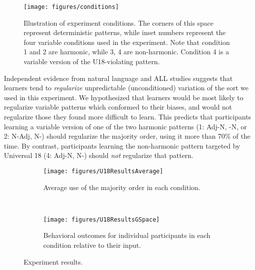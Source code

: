\documentclass[output=paper]{langsci/langscibook}
\begin{document}
\begin{figure}
\texttt{[image: figures/conditions]}
\caption{Illustration of experiment conditions. The corners of this space represent deterministic patterns, while inset numbers represent the four variable conditions used in the experiment. Note that condition 1 and 2 are harmonic, while 3, 4 are non-harmonic. Condition 4 is a variable version of the U18-violating pattern.}\label{fig: U18conditions}
\end{figure}

Independent evidence from natural language and  ALL studies \citep[e.g.,][]{SingletonNewport04,HudsonKamNewport09} suggests that learners tend to \textit{regularize}  unpredictable (unconditioned) variation of the sort we used in this experiment. We hypothesized that learners would be most likely to regularize variable patterns which conformed to their biases,  and would not regularize those they found more difficult to learn. This predicts that participants learning a variable version of one of the two harmonic  patterns (1: Adj-N, -N, or 2: N-Adj, N-) should regularize the majority order, using it more than 70\% of the time. By contrast, participants learning the non-harmonic pattern targeted by Universal 18 (4: Adj-N, N-) should \textit{not} regularize that pattern.

 


\begin{figure}
\begin{subfigure}[b]{0.45\textwidth}
\texttt{[image: figures/U18ResultsAverage]}%
\caption{Average use of the majority order in each condition.\\}
\end{subfigure}
~~~~
\begin{subfigure}[b]{0.45\textwidth}
\texttt{[image: figures/U18ResultsGSpace]}
\caption{Behavioral outcomes for individual participants in each condition relative to their input.}
\end{subfigure}
\caption{Experiment results.}\label{fig: U18results}
\end{figure}
\end{document}
